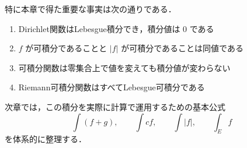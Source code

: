 特に本章で得た重要な事実は次の通りである．
\begin{enumerate}
    \item Dirichlet関数はLebesgue積分でき，積分値は $0$ である
    \item $f$ が可積分であることと $|f|$ が可積分であることは同値である
    \item 可積分関数は零集合上で値を変えても積分値が変わらない
    \item Riemann可積分関数はすべてLebesgue可積分である
\end{enumerate}

次章では，この積分を実際に計算で運用するための基本公式
\[
\int(f+g),\qquad \int cf,\qquad \int |f|,\qquad \int_E f
\]
を体系的に整理する．
